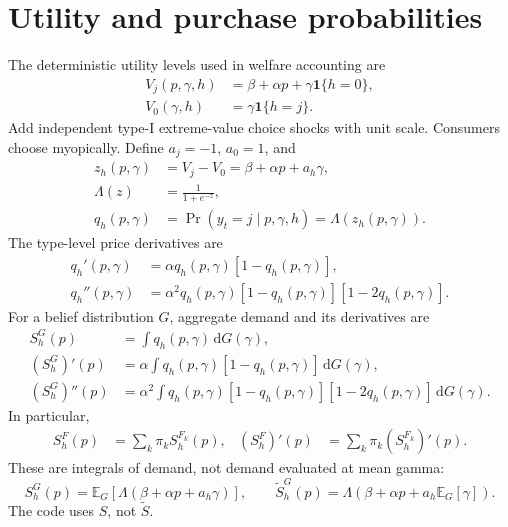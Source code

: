 \documentclass[11pt]{article}
\newcommand{\E}{\mathbb{E}}
\newcommand{\ind}{\mathbf{1}}
\newcommand{\dd}{\,\mathrm{d}}
\begin{document}
\section{Utility and purchase probabilities}
The deterministic utility levels used in welfare accounting are
\begin{align}
 V_j(p,\gamma,h)&=\beta+\alpha p+\gamma\ind\{h=0\},\\
 V_0(\gamma,h)&=\gamma\ind\{h=j\}.
\end{align}
Add independent type-I extreme-value choice shocks with unit scale.
Consumers choose myopically. Define $a_j=-1$, $a_0=1$, and
\begin{align}
 z_h(p,\gamma)&=V_j-V_0=\beta+\alpha p+a_h\gamma,\\
 \Lambda(z)&=\frac{1}{1+e^{-z}},\\
 q_h(p,\gamma)&=\Pr(y_t=j\mid p,\gamma,h)
 =\Lambda(z_h(p,\gamma)).
\end{align}
The type-level price derivatives are
\begin{align}
 q_h'(p,\gamma)&=\alpha q_h(p,\gamma)[1-q_h(p,\gamma)],\\
 q_h''(p,\gamma)&=\alpha^2q_h(p,\gamma)[1-q_h(p,\gamma)]
 [1-2q_h(p,\gamma)].
\end{align}
For a belief distribution $G$, aggregate demand and its derivatives are
\begin{align}
 S_h^G(p)&=\int q_h(p,\gamma)\dd G(\gamma),\\
 (S_h^G)'(p)&=\alpha\int q_h(p,\gamma)[1-q_h(p,\gamma)]\dd G(\gamma),\\
 (S_h^G)''(p)&=\alpha^2\int q_h(p,\gamma)[1-q_h(p,\gamma)]
 [1-2q_h(p,\gamma)]\dd G(\gamma).
\end{align}
In particular,
\begin{align}
 S_h^F(p)&=\sum_k\pi_k S_h^{F_k}(p),&
 (S_h^F)'(p)&=\sum_k\pi_k(S_h^{F_k})'(p).
\end{align}
These are integrals of demand, not demand evaluated at mean gamma:
\begin{equation}
 S_h^G(p)=\E_G[\Lambda(\beta+\alpha p+a_h\gamma)],
 \qquad
 \widetilde S_h^G(p)=\Lambda(\beta+\alpha p+a_h\E_G[\gamma]).
\end{equation}
The code uses $S$, not $\widetilde S$.
\end{document}

